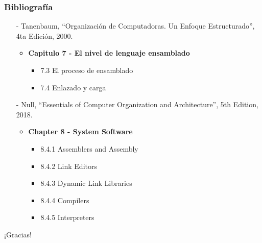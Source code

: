 \documentclass[aspectratio=169]{beamer}
\begin{document}
\begin{frame}[fragile]
    \frametitle{Bibliografía}
    \begin{itemize}
     \setlength\itemsep{0.5cm}
    \item[-] \small Tanenbaum, “Organización de Computadoras. Un Enfoque Estructurado”, 4ta Edición, 2000.\\
    \begin{itemize}
     \item \textbf{Capitulo 7 - El nivel de lenguaje ensamblado}
     \begin{itemize} 
        \item 7.3 El proceso de ensamblado
        \item 7.4 Enlazado y carga
     \end{itemize}
    \end{itemize}
    \item[-] \small Null, “Essentials of Computer Organization and Architecture”, 5th Edition, 2018.\\
    \begin{itemize}
    \item \textbf{Chapter 8 - System Software}
     \begin{itemize} 
        \item 8.4.1 Assemblers and Assembly
        \item 8.4.2 Link Editors
        \item 8.4.3 Dynamic Link Libraries
        \item 8.4.4 Compilers
        \item 8.4.5 Interpreters
     \end{itemize}
    \end{itemize}
    \end{itemize}
\end{frame}

\begin{frame}[plain]
    \begin{center}
    \vspace{2cm}
    \huge ¡Gracias!\\
    \vspace{2cm}
    \end{center}
\end{frame}
\end{document}
